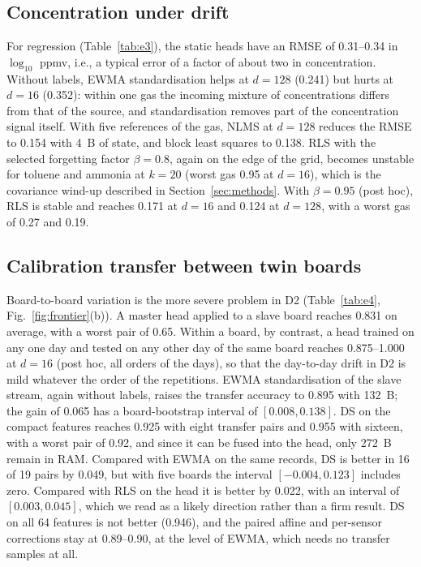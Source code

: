 \documentclass[journal,twoside,web]{ieeecolor}
\begin{document}
\subsection{Concentration under drift}

For regression (Table~\ref{tab:e3}), the static heads have an RMSE of 0.31--0.34 in $\log_{10}$ ppmv, i.e., a typical error of a factor of about two in concentration. Without labels, EWMA standardisation helps at $d=128$ (0.241) but hurts at $d=16$ (0.352): within one gas the incoming mixture of concentrations differs from that of the source, and standardisation removes part of the concentration signal itself. With five references of the gas, NLMS at $d=128$ reduces the RMSE to 0.154 with 4~B of state, and block least squares to 0.138. RLS with the selected forgetting factor $\beta=0.8$, again on the edge of the grid, becomes unstable for toluene and ammonia at $k=20$ (worst gas 0.95 at $d=16$), which is the covariance wind-up described in Section~\ref{sec:methods}. With $\beta=0.95$ (post hoc), RLS is stable and reaches 0.171 at $d=16$ and 0.124 at $d=128$, with a worst gas of 0.27 and 0.19.

\subsection{Calibration transfer between twin boards}
\label{sec:transfer}

Board-to-board variation is the more severe problem in D2 (Table~\ref{tab:e4}, Fig.~\ref{fig:frontier}(b)). A master head applied to a slave board reaches 0.831 on average, with a worst pair of 0.65. Within a board, by contrast, a head trained on any one day and tested on any other day of the same board reaches 0.875--1.000 at $d=16$ (post hoc, all orders of the days), so that the day-to-day drift in D2 is mild whatever the order of the repetitions. EWMA standardisation of the slave stream, again without labels, raises the transfer accuracy to 0.895 with 132~B; the gain of 0.065 has a board-bootstrap interval of $[0.008, 0.138]$. DS on the compact features reaches 0.925 with eight transfer pairs and 0.955 with sixteen, with a worst pair of 0.92, and since it can be fused into the head, only 272~B remain in RAM. Compared with EWMA on the same records, DS is better in 16 of 19 pairs by 0.049, but with five boards the interval $[-0.004, 0.123]$ includes zero. Compared with RLS on the head it is better by 0.022, with an interval of $[0.003, 0.045]$, which we read as a likely direction rather than a firm result. DS on all 64 features is not better (0.946), and the paired affine and per-sensor corrections stay at 0.89--0.90, at the level of EWMA, which needs no transfer samples at all.
\end{document}
